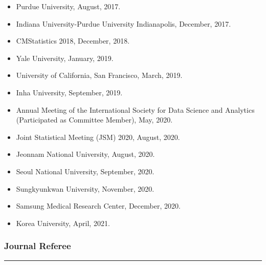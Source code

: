 \documentclass[
]{book}
\begin{document}
\begin{itemize}
\item
  Purdue University, August, 2017.
\item
  Indiana University-Purdue University Indianapolis, December, 2017.
\item
  CMStatistics 2018, December, 2018.
\item
  Yale University, January, 2019.
\item
  University of California, San Francisco, March, 2019.
\item
  Inha University, September, 2019.
\item
  Annual Meeting of the International Society for Data Science and Analytics (Participated as Committee Member), May, 2020.
\item
  Joint Statistical Meeting (JSM) 2020, August, 2020.
\item
  Jeonnam National University, August, 2020.
\item
  Seoul National University, September, 2020.
\item
  Sungkyunkwan University, November, 2020.
\item
  Samsung Medical Research Center, December, 2020.
\item
  Korea University, April, 2021.
\end{itemize}

\hypertarget{journal-referee}{%
\subsubsection*{Journal Referee}\label{journal-referee}}

\begin{center}\rule{0.5\linewidth}{0.5pt}\end{center}
\end{document}
